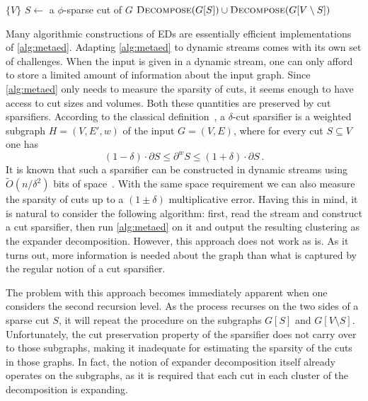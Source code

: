 \documentclass[epsfig,letter,11pt]{article}
\numberwithin{equation}{section}
\newcommand{\otil}{\tilde{O}}
\newcommand{\uncutg}[1]{{\partial} #1}
\newcommand{\wcutg}[1]{\partial^w #1}
\newcommand{\ed}{\textsc{Decompose}}
\renewcommand{\tilde}{\widetilde}
\begin{document}
\begin{algorithm}[H]
	\caption{\ed: recursive procedure for computing a $(O(\phi \log n), \phi)$-ED of $G$}
	\label{alg:metaed}
	
	\begin{algorithmic}[1]
		\Procedure{$\ed(G)$}{} 
		
		 \Return $\{V\}$
		\Else
		\State $S \gets $ a $\phi$-sparse cut of $G$ \label{eq:sparsecut}
		\State \Return $\ed(G[S]) \cup \ed(G[V \setminus S])$
		\EndIf
		
		\EndProcedure
	\end{algorithmic}
\end{algorithm}
\noindent
Many algorithmic constructions of EDs are essentially efficient implementations of \cref{alg:metaed}. Adapting \cref{alg:metaed} to dynamic streams comes with its own set of challenges.
When the input is given in a dynamic stream, one can only afford to store a limited amount of information about the input graph. Since \cref{alg:metaed} only needs to measure the sparsity of cuts, it seems enough to have access to cut sizes and volumes. Both these quantities are preserved by cut sparsifiers. According to the classical definition~\cite{benczurkarger}, a $\delta$-cut sparsifier is a weighted subgraph $H=(V,E',w)$ of the input $G=(V,E)$, where for every cut $S \subseteq V$ one has
\begin{equation*}
	(1-\delta)\cdot \uncutg{S} \le \wcutg{S}\le (1+\delta) \cdot \uncutg{S} \, .
\end{equation*}
It is known that such a sparsifier can be constructed in dynamic streams using $\otil(n/\delta^2)$ bits of space~\cite{sparsdynamicstreams}. With the same space requirement we can also measure the sparsity of cuts up to a $(1\pm \delta)$ multiplicative error. Having this in mind, it is natural to consider the following algorithm: first, read the stream and construct a cut sparsifier, then run \cref{alg:metaed} on it and output the resulting clustering as the expander decomposition. However, this approach does not work as is. As it turns out, more information is needed about the graph than what is captured by the regular notion of a cut sparsifier.

The problem with this approach becomes immediately apparent when one considers the second recursion level. As the process recurses on the two sides of a sparse cut $S$, it will repeat the procedure on the subgraphs $G[S]$ and $G[V \setminus S]$. Unfortunately, the cut preservation property of the sparsifier does not carry over to those subgraphs, making it inadequate for estimating the sparsity of the cuts in those graphs. 
In fact, the notion of expander decomposition itself already operates on the subgraphs, as it is required that each cut in each cluster of the decomposition is expanding.
\end{document}
